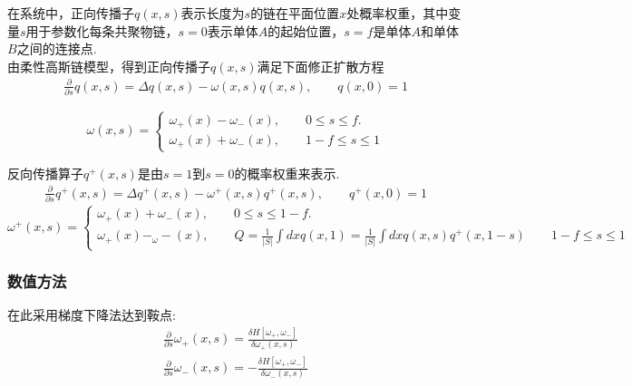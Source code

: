 \documentclass[12pt]{article}
\begin{document}
\begin{CJK}{UTF8}{gkai}
    在系统中，正向传播子$q(x,s)$表示长度为$s$的链在平面位置$x$处概率权重，其中变量$s$用于参数化每条共聚物链，$s=0$表示单体$A$的起始位置，$s=f$是单体$A$和单体$B$之间的连接点.\\
    
    由柔性高斯链模型，得到正向传播子$q(x,s)$满足下面修正扩散方程\\
    
    \begin{gather}
    \frac{\partial}{\partial s}q(x,s)=\Delta q(x,s)-\omega(x,s)q(x,s),\qquad q(x,0)=1   
    \end{gather} 
      
    \begin{equation}\label{eq:dirichlet}
    \omega(x,s)=\begin{cases}
    \omega_+(x)-\omega_-(x),\qquad 0\leq s \leq f.\\
    \omega_+(x)+\omega_-(x),\qquad 1-f\leq s \leq 1 
    \end{cases}
    \end{equation}
    

    反向传播算子$q^{+}(x,s)$是由$s=1$到$s=0$的概率权重来表示.\\
    
   \begin{gather} 
   \frac{\partial}{\partial s}q^{+}(x,s)=\Delta q^{+}(x,s)-\omega^{+}(x,s)q^{+}(x,s),\qquad q^{+}(x,0)=1 \end{gather}
    \begin{equation}\label{eq:dirichlet}
    \omega^{+}(x,s)=\begin{cases}
    \omega_+(x)+\omega_-(x),\qquad 0\leq s \leq 1-f.\\
    \omega_+(x)-_\omega-(x),\qquad  Q=\frac{1}{|S|}\int dx q(x,1)=\frac{1}{|S|}\int dx q(x,s)q^{+}(x,1-s)\qquad 1-f\leq s \leq 1 
    \end{cases}
    \end{equation}
    \subsubsection{数值方法}
    
         在此采用梯度下降法达到鞍点:\\
         
    \begin{gather}    
    \frac{\partial}{\partial s}\omega_+(x,s)=\frac{\delta H[\omega_+,\omega_-]}{\delta \omega_+(x,s)}\\
    \frac{\partial}{\partial s}\omega_-(x,s)=-\frac{\delta H[\omega_+,\omega_-]}{\delta \omega_-(x,s)}    
    \end{gather}
    

\end{CJK}
\end{document}
